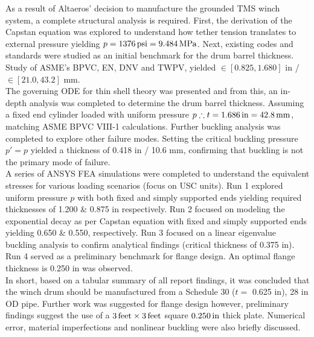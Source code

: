 As a result of Altaeros' decision to manufacture the grounded TMS winch system, a complete structural analysis is required. First, the derivation of the Capstan equation was explored to understand how tether tension translates to external pressure yielding $p=1376\,\mathrm{psi}= 9.484\,\mathrm{MPa}$. Next, existing codes and standards were studied as an initial benchmark for the drum barrel thickness. Study of ASME's BPVC, EN, DNV and TWPV, yielded $\in [0.825, 1.680]$ in / $\in [21.0, 43.2]$ mm.\\

The governing ODE for thin shell theory was presented and from this, an in-depth analysis was completed to determine the drum barrel thickness. Assuming a fixed end cylinder loaded with uniform pressure $p \therefore t = 1.686\,\mathrm{in}=42.8\,\mathrm{mm}$, matching ASME BPVC VIII-1 calculations. Further buckling analysis was completed to explore other failure modes. Setting the critical buckling pressure $p'=p$ yielded a thickness of 0.418 in / 10.6 mm, confirming that buckling is not the primary mode of failure.\\

A series of ANSYS FEA simulations were completed to understand the equivalent stresses for various loading scenarios (focus on USC units). Run 1 explored uniform pressure $p$ with both fixed and simply supported ends yielding required thicknesses of 1.200 \& 0.875 in respectively. Run 2 focused on modeling the exponential decay as per Capstan equation with fixed and simply supported ends yielding 0.650 \& 0.550, respectively. Run 3 focused on a linear eigenvalue buckling analysis to confirm analytical findings (critical thickness of 0.375 in). Run 4 served as a preliminary benchmark for flange design. An optimal flange thickness is 0.250 in was observed.\\

In short, based on a tabular summary of all report findings, it was concluded that the winch drum should be manufactured from a Schedule 30 ($t=$ 0.625 in), 28 in OD pipe. Further work was suggested for flange design however, preliminary findings suggest the use of a $3\,\mathrm{feet}\times 3\,\mathrm{feet}$ square $0.250\,\mathrm{in}$ thick plate. Numerical error, material imperfections and nonlinear buckling were also briefly discussed.
